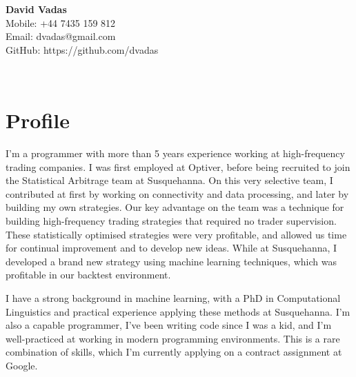 \documentclass[]{article}
\begin{document}
\hrulefill
\begin{center}
\Huge{\textbf{David Vadas}}\\
\vspace{0.5cm}
\normalsize
Mobile: +44 7435 159 812\\
Email: dvadas@gmail.com\\ %
GitHub: https://github.com/dvadas
\end{center}
\hrulefill
\\

\section*{Profile}

\hspace{0.5cm}I'm a programmer with more than 5 years experience working at high-frequency trading companies. I was first employed at Optiver, before being recruited to join
the Statistical Arbitrage team at Susquehanna. On this very selective team, I contributed at first by working on connectivity and data processing, and later by
building my own strategies. Our key advantage on the team was a technique for building high-frequency trading strategies that required no 
trader supervision. These statistically optimised strategies were very profitable, and allowed us time for continual improvement and to develop new ideas.
While at Susquehanna, I developed a brand new strategy using machine learning techniques, which was profitable in our backtest environment.

\hspace{0.5cm}
I have a strong background in machine learning, with a PhD in Computational Linguistics and practical experience applying these methods at Susquehanna.
I'm also a capable programmer, I've been writing code since I was a kid, and I'm well-practiced at working in modern programming environments.
This is a rare combination of skills, which I'm currently applying on a contract assignment at Google.
\end{document}
